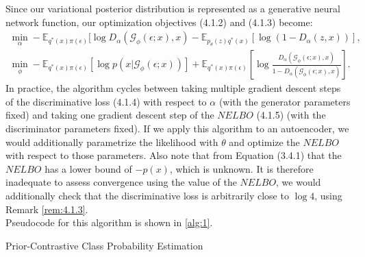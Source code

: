 \documentclass[honours,12pt]{unswthesis}
\numberwithin{equation}{section}
\theoremstyle{definition}
\begin{document}
Since our variational posterior distribution is represented as a generative neural network function, our optimization objectives (4.1.2) and (4.1.3) become:
\begin{align}
\min_\alpha -\mathbb{E}_{q^*(x)\pi(\epsilon)}[\log D_\alpha(\mathcal{G}_\phi(\epsilon;x),x)-\mathbb{E}_{p_\theta(z)q^*(x)}[\log (1-D_\alpha(z,x))],\\
\min_\phi -\mathbb{E}_{q^*(x)\pi (\epsilon)}[\log p(x|\mathcal{G}_\phi(\epsilon;x))]+\mathbb{E}_{q^*(x)\pi(\epsilon)}\left[\log \frac{D_\alpha(\mathcal{G}_\phi(\epsilon;x),x)}{1-D_\alpha(\mathcal{G}_\phi(\epsilon;x),x)}\right].
\end{align}
In practice, the algorithm cycles between taking multiple gradient descent steps of the discriminative loss (4.1.4) with respect to $\alpha$ (with the generator parameters fixed) and taking one gradient descent step of the $NELBO$ (4.1.5) (with the discriminator parameters fixed). If we apply this algorithm to an autoencoder, we would additionally parametrize the likelihood with $\theta$ and optimize the $NELBO$ with respect to those parameters. Also note that from Equation (3.4.1) that the $NELBO$ has a lower bound of $-p(x)$, which is unknown. It is therefore inadequate to assess convergence using the value of the $NELBO$, we would additionally check that the discriminative loss is arbitrarily close to $\log 4$, using Remark \ref{rem:4.1.3}.\\
Pseudocode for this algorithm is shown in \autoref{alg:1}.
\begin{algorithm}
\caption{Prior-Contrastive Class Probability Estimation}
\BlankLine
{}
\label{alg:1}
\end{algorithm}
\newpage
\end{document}
